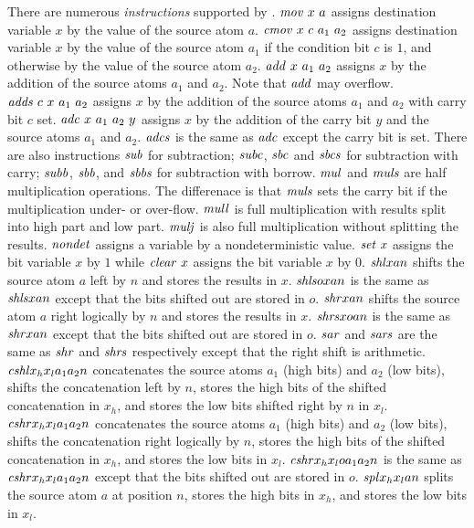 \documentclass{article}
\begin{document}
There are numerous \emph{instructions} supported by \cryptoline.
$\mathit{mov}\ x\ a$ assigns destination variable $x$ by the value of the
source atom $a$.
$\mathit{cmov}\ x\ c\ a_1\ a_2$ assigns destination variable $x$ by the value of the
source atom $a_1$ if the condition bit $c$ is $1$, and otherwise by
the value of the source atom $a_2$.
$\mathit{add}\ x\ a_1\ a_2$ assigns $x$ by the addition of the source atoms
$a_1$ and $a_2$.
Note that $\mathit{add}$ may overflow.
$\mathit{adds}\ c\ x\ a_1\ a_2$ assigns $x$ by the addition of the source atoms
$a_1$ and $a_2$ with carry bit $c$ set.
$\mathit{adc}\ x\ a_1\ a_2\ y$ assigns $x$ by the addition of the carry bit $y$
and the source atoms $a_1$ and $a_2$.
$\mathit{adcs}$ is the same as $\mathit{adc}$ except the carry bit is set.
There are also instructions $\mathit{sub}$ for subtraction; $\mathit{subc}$, $\mathit{sbc}$
and $\mathit{sbcs}$ for subtraction with carry; $\mathit{subb}$, $\mathit{sbb}$, and
$\mathit{sbbs}$ for subtraction with borrow.
$\mathit{mul}$ and $\mathit{muls}$ are half multiplication operations.
The differenace is that $\mathit{muls}$ sets the carry bit if the
multiplication under- or over-flow.
$\mathit{mull}$ is full multiplication with results split into high part and
low part.
$\mathit{mulj}$ is also full multiplication without splitting the results.
$\mathit{nondet}$ assigns a variable by a nondeterministic value.
$\mathit{set}\ x$ assigns the bit variable $x$ by $1$ while $\mathit{clear}\ x$
assigns the bit variable $x$ by $0$.
$\mathit{shl} x a n$ shifts the source atom $a$ left by $n$ and stores the
results in $x$.
$\mathit{shls} o x a n$ is the same as $\mathit{shls} x a n$ except that the bits
shifted out are stored in $o$.
$\mathit{shr} x a n$ shifts the source atom $a$ right logically by $n$ and
stores the results in $x$.
$\mathit{shrs} x o a n$ is the same as $\mathit{shr} x a n$ except that the bits
shifted out are stored in $o$.
$\mathit{sar}$ and $\mathit{sars}$ are the same as $\mathit{shr}$ and $\mathit{shrs}$ respectively
except that the right shift is arithmetic.
$\mathit{cshl} x_h x_l a_1 a_2 n$ concatenates the source atoms $a_1$ (high
bits) and $a_2$ (low bits), shifts the concatenation left by $n$,
stores the high bits of the shifted concatenation in $x_h$, and stores
the low bits shifted right by $n$ in $x_l$.
$\mathit{cshr} x_h x_l a_1 a_2 n$ concatenates the source atoms $a_1$ (high
bits) and $a_2$ (low bits), shifts the concatenation right logically
by $n$, stores the high bits of the shifted concatenation in $x_h$,
and stores the low bits in $x_l$.
$\mathit{cshr} x_h x_l o a_1 a_2 n$ is the same as $\mathit{cshr} x_h x_l a_1 a_2 n$
except that the bits shifted out are stored in $o$.
$\mathit{spl} x_h x_l a n$ splits the source atom $a$ at position $n$, stores
the high bits in $x_h$, and stores the low bits in $x_l$.
\end{document}
